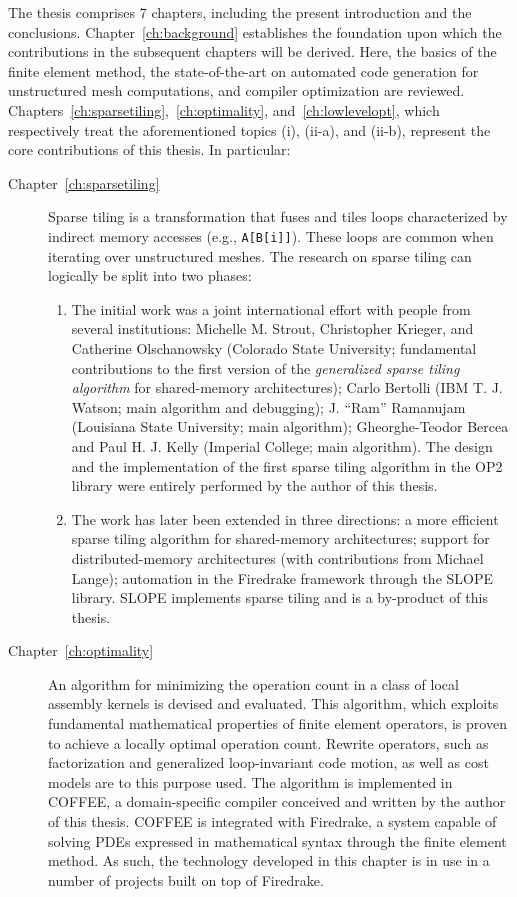 The thesis comprises 7 chapters, including the present introduction and the conclusions. Chapter~\ref{ch:background} establishes the foundation upon which the contributions in the subsequent chapters will be derived. Here, the basics of the finite element method, the state-of-the-art on automated code generation for unstructured mesh computations, and compiler optimization are reviewed. Chapters~\ref{ch:sparsetiling},~\ref{ch:optimality}, and~\ref{ch:lowlevelopt}, which respectively treat the aforementioned topics (i), (ii-a), and (ii-b), represent the core contributions of this thesis. In particular:

\begin{description}
\item[Chapter~\ref{ch:sparsetiling}] Sparse tiling is a transformation that fuses and tiles loops characterized by indirect memory accesses (e.g., {\tt A[B[i]]}). These loops are common when iterating over unstructured meshes. The research on sparse tiling can logically be split into two phases:
\begin{enumerate}
\item The initial work was a joint international effort with people from several institutions: Michelle M. Strout, Christopher Krieger, and Catherine Olschanowsky (Colorado State University; fundamental contributions to the first version of the {\em generalized sparse tiling algorithm} for shared-memory architectures); Carlo Bertolli (IBM T. J. Watson; main algorithm and debugging); J. ``Ram'' Ramanujam (Louisiana State University; main algorithm); Gheorghe-Teodor Bercea and Paul H. J. Kelly (Imperial College; main algorithm). The design and the implementation of the first sparse tiling algorithm in the OP2 library were entirely performed by the author of this thesis. 
\item The work has later been extended in three directions: a more efficient sparse tiling algorithm for shared-memory architectures; support for distributed-memory architectures (with contributions from Michael Lange); automation in the Firedrake framework through the SLOPE library. SLOPE implements sparse tiling and is a by-product of this thesis.
\end{enumerate}

\item[Chapter~\ref{ch:optimality}] An algorithm for minimizing the operation count in a class of local assembly kernels is devised and evaluated. This algorithm, which exploits fundamental mathematical properties of finite element operators, is proven to achieve a locally optimal operation count. Rewrite operators, such as factorization and generalized loop-invariant code motion, as well as cost models are to this purpose used. The algorithm is implemented in COFFEE, a domain-specific compiler conceived and written by the author of this thesis. COFFEE is integrated with Firedrake, a system capable of solving PDEs expressed in mathematical syntax through the finite element method. As such, the technology developed in this chapter is in use in a number of projects built on top of Firedrake.


\end{description}
